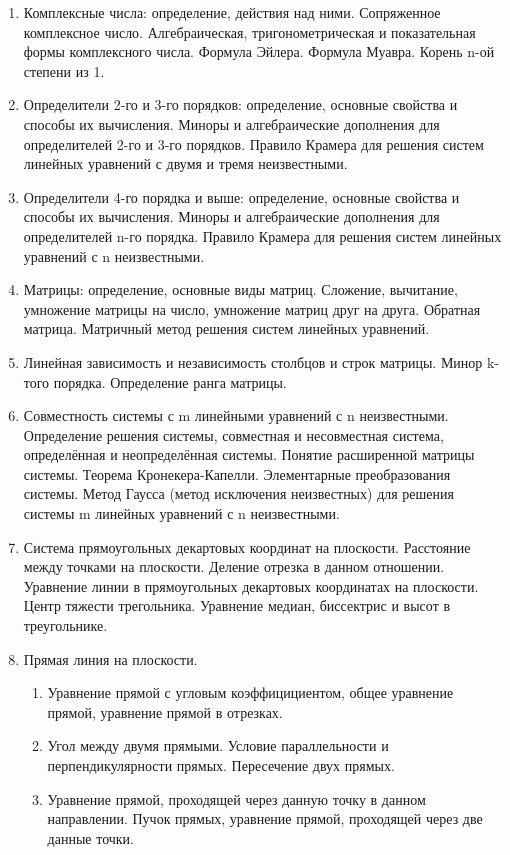 \documentclass[a4paper,12pt,russian]{extreport}
\begin{document}
\begin{enumerate}
\item Комплексные числа: определение, действия над ними. Сопряженное комплексное число. Алгебраическая, тригонометрическая и показательная формы комплексного числа. Формула Эйлера. Формула Муавра. Корень n-ой степени из 1.
\item Определители 2-го и 3-го порядков: определение, основные свойства и способы их вычисления. Миноры и алгебраические дополнения для определителей 2-го и 3-го порядков. Правило Крамера для решения систем линейных уравнений с двумя и тремя неизвестными.
\item Определители 4-го порядка и выше: определение, основные свойства и способы их вычисления. Миноры и алгебраические дополнения для определителей n-го порядка. Правило Крамера для решения систем линейных уравнений с n неизвестными.
\item Матрицы: определение, основные виды матриц. Сложение, вычитание, умножение матрицы на число, умножение матриц друг на друга. Обратная матрица. Матричный метод решения систем линейных уравнений.
\item Линейная зависимость и независимость столбцов и строк матрицы. Минор k-того порядка. Определение ранга матрицы.
\item Совместность системы с m линейными уравнений с n неизвестными. Определение решения системы, совместная и несовместная система, определённая и неопределённая системы. Понятие расширенной матрицы системы. Теорема Кронекера-Капелли. Элементарные преобразования системы. Метод Гаусса (метод исключения неизвестных) для решения системы m линейных уравнений с n неизвестными.
\item Система прямоугольных декартовых координат на плоскости. Расстояние между точками на плоскости. Деление отрезка в данном отношении. Уравнение линии в прямоугольных декартовых координатах на плоскости. Центр тяжести трегольника. Уравнение медиан, биссектрис и высот в треугольнике.
\item Прямая линия на плоскости.
  \begin{enumerate}
  \item Уравнение прямой с угловым коэффицициентом, общее уравнение прямой, уравнение прямой в отрезках.
  \item Угол между двумя прямыми. Условие параллельности и перпендикулярности прямых. Пересечение двух прямых.
  \item Уравнение прямой, проходящей через данную точку в данном направлении. Пучок прямых, уравнение прямой, проходящей через две данные точки.

\end{enumerate}
\end{enumerate}
\end{document}
